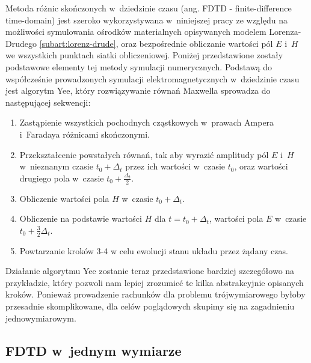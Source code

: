 \label{subart:fdtd}
Metoda różnic skończonych w~dziedzinie czasu (ang. FDTD - finite-difference time-domain) jest szeroko wykorzystywana w~niniejszej pracy ze względu na możliwości symulowania ośrodków materialnych opisywanych modelem Lorenza-Drudego \ref{subart:lorenz-drude}, oraz bezpośrednie obliczanie wartości pól $E$ i~$H$ we wszystkich punktach siatki obliczeniowej. Poniżej przedstawione zostały podstawowe elementy tej metody symulacji numerycznych.
Podstawą do współcześnie prowadzonych symulacji elektromagnetycznych w~dziedzinie czasu jest algorytm Yee\cite{1966ITAP14302Y}, który rozwiązywanie równań Maxwella sprowadza do następującej sekwencji:
\begin{enumerate}
\item Zastąpienie wszystkich pochodnych cząstkowych w~prawach Ampera i~Faradaya różnicami skończonymi.
\item Przekształcenie powstałych równań, tak aby wyrazić amplitudy pól $E$ i~$H$ w~nieznanym czasie $t_0 +  \Delta_t$ przez ich wartości w~czasie $t_0$, oraz wartości drugiego pola w~czasie $t_0+ \frac{\Delta_t}{2}$.
\item Obliczenie wartości pola $H$ w~czasie $t_0 +  \Delta_t$.
\item Obliczenie na podstawie wartości $H$ dla $t=t_0+  \Delta_t$, wartości pola $E$ w~czasie $t_0 + \frac{3}{2} \Delta_t$.
\item Powtarzanie kroków 3-4 w celu ewolucji stanu układu przez żądany czas.
\end{enumerate}
Działanie algorytmu Yee zostanie teraz przedstawione bardziej szczegółowo na przykładzie, który pozwoli nam lepiej zrozumieć te kilka abstrakcyjnie opisanych kroków. Ponieważ prowadzenie rachunków dla problemu trójwymiarowego byłoby przesadnie skomplikowane, dla celów poglądowych skupimy się na zagadnieniu jednowymiarowym.

\subsection{FDTD w~jednym wymiarze}


